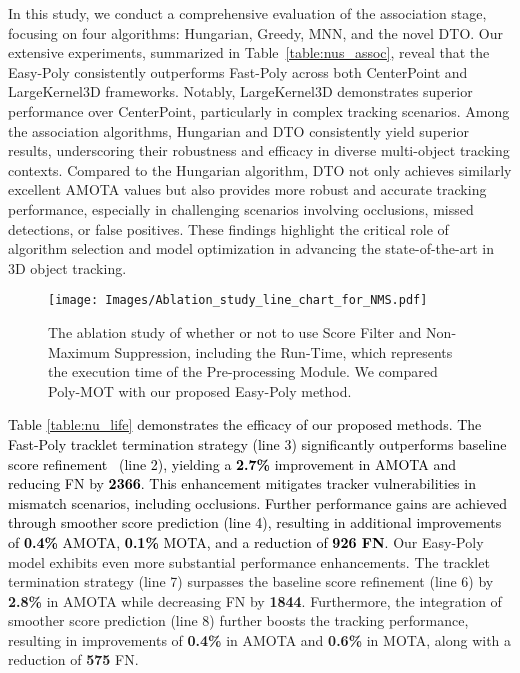 In this study, we conduct a comprehensive evaluation of the association stage, focusing on four algorithms: Hungarian, Greedy, MNN, and the novel DTO. Our extensive experiments, summarized in Table~\ref{table:nus_assoc}, reveal that the Easy-Poly consistently outperforms Fast-Poly across both CenterPoint and LargeKernel3D frameworks. Notably, LargeKernel3D demonstrates superior performance over CenterPoint, particularly in complex tracking scenarios. Among the association algorithms, Hungarian and DTO consistently yield superior results, underscoring their robustness and efficacy in diverse multi-object tracking contexts. Compared to the Hungarian algorithm, DTO not only achieves similarly excellent AMOTA values but also provides more robust and accurate tracking performance, especially in challenging scenarios involving occlusions, missed detections, or false positives. These findings highlight the critical role of algorithm selection and model optimization in advancing the state-of-the-art in 3D object tracking.

\begin{figure*}[t]
    \centering
    \texttt{[image: Images/Ablation\_study\_line\_chart\_for\_NMS.pdf]}
    \vspace{-8pt}
    \caption
    {
      The ablation study of whether or not to use Score Filter and Non-Maximum Suppression, including the Run-Time, which represents the execution time of the Pre-processing Module. We compared Poly-MOT with our proposed Easy-Poly method.
     }
     \Description{}
    \label{fig: NMSFS}
\end{figure*}


\textcolor{black}{Table \ref{table:nu_life} demonstrates the efficacy of our proposed methods. The Fast-Poly tracklet termination strategy (line 3) significantly outperforms baseline score refinement~\cite{benbarka2021score} (line 2), yielding a \textbf{2.7\%} improvement in AMOTA and reducing FN by \textbf{2366}. This enhancement mitigates tracker vulnerabilities in mismatch scenarios, including occlusions. Further performance gains are achieved through smoother score prediction (line 4), resulting in additional improvements of \textbf{0.4\%} AMOTA, \textbf{0.1\%} MOTA, and a reduction of \textbf{926 FN}.}
Our Easy-Poly model exhibits even more substantial performance enhancements. The tracklet termination strategy (line 7) surpasses the baseline score refinement (line 6) by \textbf{2.8\%} in AMOTA while decreasing FN by \textbf{1844}. Furthermore, the integration of smoother score prediction (line 8) further boosts the tracking performance, resulting in improvements of \textbf{0.4\%} in AMOTA and \textbf{0.6\%} in MOTA, along with a reduction of \textbf{575} FN.


